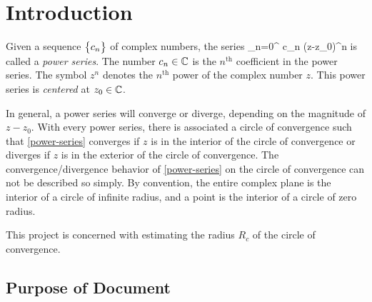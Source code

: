 \documentclass[12pt]{article}
\begin{document}


\section{Introduction} \label{sc:introduction}

Given a sequence $\bigl\{ {c_n} \bigr\}$ of complex numbers, the series
\EQ
{
  \label{eq:power-series}
  \sum_{n=0}^{\infty} c_n (z-z_0)^n
}
is called a {\it power series}. The number $c_n  \in \mathbb{C}$ is the $n^\text{th}$ coefficient in the power series.
The symbol $z^n$ denotes the $n^\text{th}$ power of the complex number $z$. This power series is {\it centered}
at $z_0 \in \mathbb{C}$.

In general, a power series will converge or diverge, depending on the magnitude of $z-z_0$.
With every power series, there is associated a circle of convergence such that
\eqref{power-series} converges if $z$ is in the interior of the circle of convergence or
diverges if $z$ is in the exterior of the circle of convergence. The convergence/divergence
behavior of \eqref{power-series} on the circle of convergence can not be described so simply.
By convention, the entire complex plane is the interior of a circle of infinite radius, and a
point is the interior of a circle of zero radius.

This project is concerned with estimating the radius $R_c$ of the circle of convergence.


\subsection{Purpose of Document}
\end{document}
